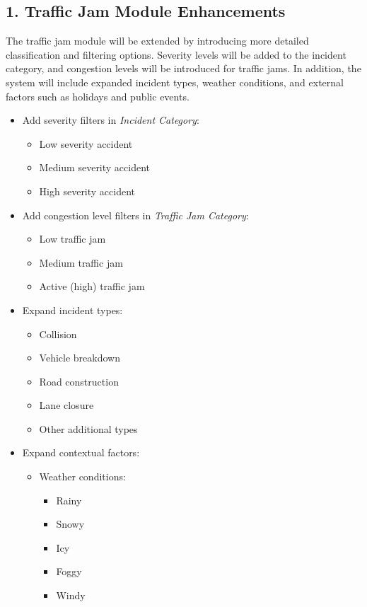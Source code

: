 \documentclass[12pt,a4paper]{report}
\begin{document}
\subsection*{1. Traffic Jam Module Enhancements}
The traffic jam module will be extended by introducing more detailed classification and filtering options. Severity levels will be added to the incident category, and congestion levels will be introduced for traffic jams. In addition, the system will include expanded incident types, weather conditions, and external factors such as holidays and public events.

\begin{itemize}
    \item Add severity filters in \textit{Incident Category}:
    \begin{itemize}
        \item Low severity accident
        \item Medium severity accident
        \item High severity accident
    \end{itemize}
    
    \item Add congestion level filters in \textit{Traffic Jam Category}:
    \begin{itemize}
        \item Low traffic jam
        \item Medium traffic jam
        \item Active (high) traffic jam
    \end{itemize}
    
    \item Expand incident types:
    \begin{itemize}
        \item Collision
        \item Vehicle breakdown
        \item Road construction
        \item Lane closure
        \item Other additional types
    \end{itemize}
    
    \item Expand contextual factors:
    \begin{itemize}
        \item Weather conditions:
        \begin{itemize}
            \item Rainy
            \item Snowy
            \item Icy
            \item Foggy
            \item Windy
        \end{itemize}
        

\end{itemize}
\end{itemize}
\end{document}
